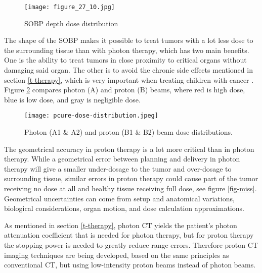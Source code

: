 \documentclass[../main/thesis.tex]{subfiles}
\begin{document}
\begin{figure}[h!]
	\centering
	\texttt{[image: figure\_27\_10.jpg]}
	\caption{\gls{SOBP} depth dose distribution \citep[fig. 27.10]{Khan}}
	\label{fig-sobp}
\end{figure}


The shape of the \gls{SOBP} makes it possible to treat tumors with a lot less dose to the surrounding tissue than with photon therapy, which has two main benefits. One is the ability to treat tumors in close proximity to critical organs without damaging said organ. The other is to avoid the chronic side effects mentioned in section \ref{t-therapy}, which is very important when treating children with cancer \citep[chap. 27]{Khan}. Figure \ref{fig-photonproton-dose} compares photon (A) and proton (B) beams, where red is high dose, blue is low dose, and gray is negligible dose. 

\begin{figure}[h]
	\centering
	\texttt{[image: pcure-dose-distribution.jpeg]}
	\caption{Photon (A1 \& A2) and proton (B1 \& B2) beam dose distributions. \citetext{\citeauthor{pcure}}}
	\label{fig-photonproton-dose}
\end{figure}

The geometrical accuracy in proton therapy is a lot more critical than in photon therapy. While a geometrical error between planning and delivery in photon therapy will give a smaller under-dosage to the tumor and over-dosage to surrounding tissue, similar errors in proton therapy could cause part of the tumor receiving no dose at all and healthy tissue receiving full dose, see figure \ref{fig-miss}. Geometrical uncertainties can come from setup and anatomical variations, biological considerations, organ motion, and dose calculation approximations. \citep{Paganetti-range} 

As mentioned in section \ref{t-therapy}, photon \gls{CT} yields the patient's photon attenuation coefficient that is needed for photon therapy, but for proton therapy the stopping power is needed to greatly reduce range errors. Therefore proton \gls{CT} imaging techniques are being developed, based on the same principles as conventional \gls{CT}, but using low-intensity proton beams instead of photon beams. \citep{proton-ct}

\end{document}
